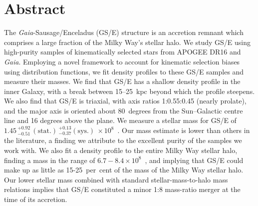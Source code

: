 \section{Abstract}
The \textit{Gaia}-Sausage/Enceladus (GS/E) structure is an accretion remnant which comprises a large fraction of the Milky Way's stellar halo. We study GS/E using high-purity samples of kinematically selected stars from APOGEE DR16 and \textit{Gaia}. Employing a novel framework to account for kinematic selection biases using distribution functions, we fit density profiles to these GS/E samples and measure their masses. We find that GS/E has a shallow density profile in the inner Galaxy, with a break between 15--25~kpc beyond which the profile steepens. We also find that GS/E is triaxial, with axis ratios 1:0.55:0.45 (nearly prolate), and the major axis is oriented about 80~degrees from the Sun--Galactic centre line and 16 degrees above the plane. We measure a stellar mass for GS/E of $1.45\,^{+0.92}_{-0.51}\,\mathrm{(stat.)}\,^{+0.13}_{-0.37} \mathrm{(sys.)}\ \times10^{8}$~\Msun. Our mass estimate is lower than others in the literature, a finding we attribute to the excellent purity of the samples we work with. We also fit a density profile to the entire Milky Way stellar halo, finding a mass in the range of $6.7-8.4 \times 10^{8}$~\Msun, and implying that GS/E could make up as little as 15-25~per~cent of the mass of the Milky Way stellar halo. Our lower stellar mass combined with standard stellar-mass-to-halo mass relations implies that GS/E constituted a minor 1:8 mass-ratio merger at the time of its accretion. 




